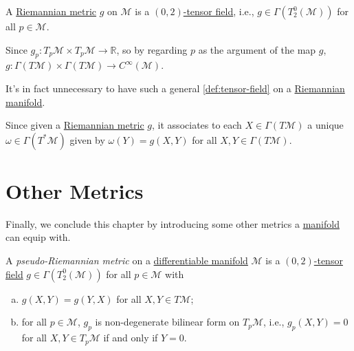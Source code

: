 
\begin{eg}
	A \hyperref[def:Riemannian-metric]{Riemannian metric} \(g\) on \(\mathcal{M} \) is a \hyperref[def:tensor-field]{\((0, 2)\)-tensor field}, i.e., \(g\in \Gamma (T_2^0 (\mathcal{M} ))\) for all \(p \in \mathcal{M} \).
\end{eg}
\begin{explanation}
	Since \(g_p \colon T_p \mathcal{M} \times T_p \mathcal{M} \to \mathbb{R} \), so by regarding \(p\) as the argument of the map \(g\), \(g\colon \Gamma (T \mathcal{M} ) \times \Gamma (T \mathcal{M} ) \to C^\infty (\mathcal{M} )\).
\end{explanation}

\begin{note}
	It's in fact unnecessary to have such a general \autoref{def:tensor-field} on a \hyperref[def:Riemannian-manifold]{Riemannian manifold}.
\end{note}
\begin{explanation}
	Since given a \hyperref[def:Riemannian-metric]{Riemannian metric} \(g\), it associates to each \(X\in \Gamma (T \mathcal{M} )\) a unique \(\omega \in \Gamma (T ^{\ast}\mathcal{M}) \) given by \(\omega (Y) = g(X, Y)\) for all \(X, Y\in \Gamma (T \mathcal{M} )\).
\end{explanation}

\section{Other Metrics}
Finally, we conclude this chapter by introducing some other metrics a \hyperref[def:smooth-manifold]{manifold} can equip with.

\begin{definition}\label{def:pseudo-Riemannian-metric}
	A \emph{pseudo-Riemannian metric} on a \hyperref[def:smooth-manifold]{differentiable manifold} \(\mathcal{M} \) is a \hyperref[def:tensor-field]{\((0, 2)\)-tensor field} \(g\in \Gamma (T_2^0 (\mathcal{M}) )\) for all \(p\in \mathcal{M} \) with
	\begin{enumerate}[(a)]
		\item \(g(X, Y) = g(Y, X)\) for all \(X, Y\in T \mathcal{M} \);
		\item for all \(p\in \mathcal{M} \), \(g_p\) is non-degenerate bilinear form on \(T_p \mathcal{M} \), i.e., \(g_p(X, Y) = 0\) for all \(X, Y\in T_p \mathcal{M} \) if and only if \(Y = 0\).
	\end{enumerate}
\end{definition}

